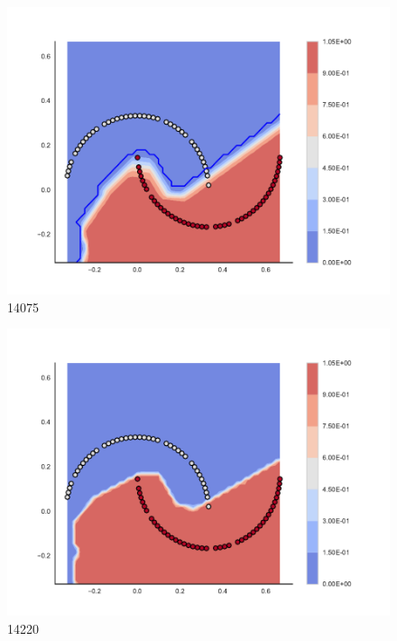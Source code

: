 \begin{subfigure}[b]{0.09\textwidth}
    \includegraphics[clip, trim=2.35cm 1.75cm 4.5cm 0cm,width=\textwidth]{img/convergence/14075.pdf}
    \caption{14075}
    \label{fig:convergence_14075}
\end{subfigure}
%
\begin{subfigure}[b]{0.09\textwidth}
    \includegraphics[clip, trim=2.35cm 1.75cm 4.5cm 0cm,width=\textwidth]{img/convergence/14220.pdf}
    \caption{14220}
    \label{fig:convergence_14220}
\end{subfigure}
%

